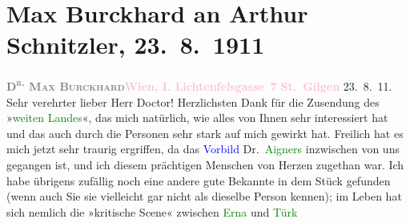 

               \section[Max Burckhard an Arthur Schnitzler, 23. 8. 1911]{ Max Burckhard an Arthur Schnitzler, 23. 8. 1911}\nopagebreak{}\rehead{ }\normalsize\beginnumbering{} \toendnotes[C]{\smallbreak\pagebreak[2]} 
\toendnotes[C]{\smallbreak}\pstart
           \noindent{}{\pb}\textcolor{gray}{\textbf{\textsc{D\textsuperscript{r.} Max
                                    Burckhard}}}\hfill \textcolor{gray}{\textbf{\textcolor{pink}{Wien, I. Lichtenfelsgasse 7}{}\ledrightnote{\textcolor{pink}{Lichtenfelsgasse}}}}\pend
           \pstart
           \raggedleft{}\textcolor{gray}{\textbf{\textcolor{pink}{St. Gilgen}{}\ledrightnote{\textcolor{pink}{St. Gilgen}}}}{ }23. 8. 11.\pend
           \pstart{}Sehr verehrter lieber Herr Doctor!\pend\pstart
           Herzlichsten Dank für die Zusendung des »\textcolor{green}{weiten
                        Landes}{}\ledrightnote{\textcolor{green}{Das weite Land. Tragikomödie in fünf Akten}}«, das mich natürlich, wie alles von Ihnen sehr interessiert hat
                    und das auch durch die Personen sehr stark auf mich gewirkt hat. Freilich hat es
                    mich jetzt sehr traurig ergriffen, da das \textcolor{blue}{Vorbild}{} Dr. \textcolor{green}{Aigners}{} inzwischen von uns gegangen ist, und ich
                    diesem prächtigen Menschen von Herzen zugethan war. Ich habe übrigens zufällig
                    noch eine andere gute Bekannte in dem Stück gefunden (wenn auch Sie sie
                    vielleicht gar nicht als dieselbe Person kennen); im Leben hat sich nemlich die
                    »kritische Scene« zwischen \textcolor{green}{Erna}{} und \textcolor{green}{Türk}{}
